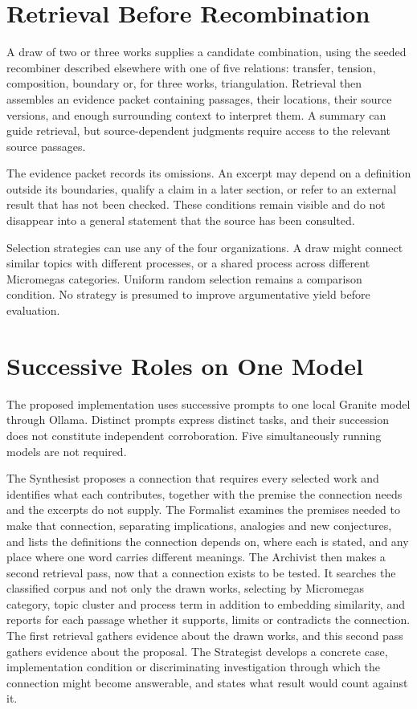 \documentclass[11pt]{article}
\begin{document}
\section{Retrieval Before Recombination}

A draw of two or three works supplies a candidate combination, using the seeded recombiner described elsewhere with one of five relations: transfer, tension, composition, boundary or, for three works, triangulation. Retrieval then assembles an evidence packet containing passages, their locations, their source versions, and enough surrounding context to interpret them. A summary can guide retrieval, but source-dependent judgments require access to the relevant source passages.

The evidence packet records its omissions. An excerpt may depend on a definition outside its boundaries, qualify a claim in a later section, or refer to an external result that has not been checked. These conditions remain visible and do not disappear into a general statement that the source has been consulted.

Selection strategies can use any of the four organizations. A draw might connect similar topics with different processes, or a shared process across different Micromegas categories. Uniform random selection remains a comparison condition. No strategy is presumed to improve argumentative yield before evaluation.

\section{Successive Roles on One Model}\label{sec:roles}

The proposed implementation uses successive prompts to one local Granite model through Ollama. Distinct prompts express distinct tasks, and their succession does not constitute independent corroboration. Five simultaneously running models are not required.

The Synthesist proposes a connection that requires every selected work and identifies what each contributes, together with the premise the connection needs and the excerpts do not supply. The Formalist examines the premises needed to make that connection, separating implications, analogies and new conjectures, and lists the definitions the connection depends on, where each is stated, and any place where one word carries different meanings. The Archivist then makes a second retrieval pass, now that a connection exists to be tested. It searches the classified corpus and not only the drawn works, selecting by Micromegas category, topic cluster and process term in addition to embedding similarity, and reports for each passage whether it supports, limits or contradicts the connection. The first retrieval gathers evidence about the drawn works, and this second pass gathers evidence about the proposal. The Strategist develops a concrete case, implementation condition or discriminating investigation through which the connection might become answerable, and states what result would count against it.
\end{document}
